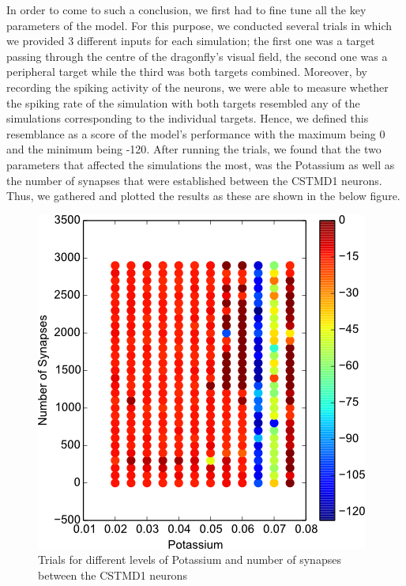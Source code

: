 \documentclass[a4paper,11pt]{article}
\begin{document}
In order to come to such a conclusion, we first had to fine tune all the key parameters of the model. For this purpose, we conducted several trials in which we provided 3 different inputs for each simulation; the first one was a target passing through the centre of the dragonfly's visual field, the second one was a peripheral target while the third was both targets combined. Moreover, by recording the spiking activity of the neurons, we were able to measure whether the spiking rate of the simulation with both targets resembled any of the simulations corresponding to the individual targets. Hence, we defined this resemblance as a score of the model's performance with the maximum being 0 and the minimum being -120. After running the trials, we found that the two parameters that affected the simulations the most, was the Potassium as well as the number of synapses that were established between the CSTMD1 neurons. Thus, we gathered and plotted the results as these are shown in the below figure.

\begin{figure}[H]
\centering
\includegraphics[scale = 0.6]{cstmd_avgscore}
\caption{Trials for different levels of Potassium and number of synapses between the CSTMD1 neurons}
\end{figure}
\end{document}
